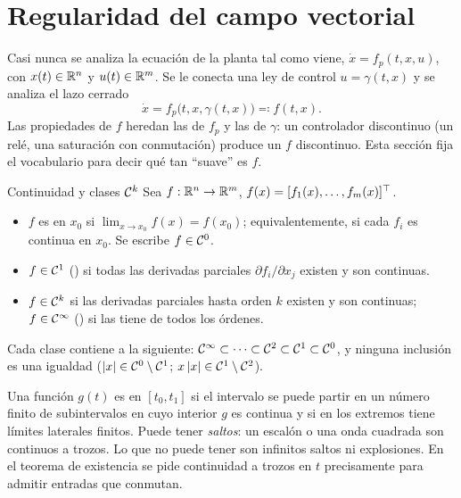 \section{Regularidad del campo vectorial}
\label{sec:pm-regularidad}

Casi nunca se analiza la ecuación de la planta tal como viene, $\dot x=f_p(t,x,u)$, con $x(t)\in\mathbb{R}^n$ y $u(t)\in\mathbb{R}^m$. Se le conecta una ley de control $u=\gamma(t,x)$ y se analiza el lazo cerrado
\begin{equation}
  \dot x=f_p\bigl(t,x,\gamma(t,x)\bigr)\eqqcolon f(t,x) .
  \label{eq:pm-lazo}
\end{equation}
Las propiedades de $f$ heredan las de $f_p$ y las de $\gamma$: un controlador discontinuo (un relé, una saturación con conmutación) produce un $f$ discontinuo. Esta sección fija el vocabulario para decir qué tan ``suave'' es $f$.

\begin{definicion}[label=def:pm-ck]{Continuidad y clases $\mathcal{C}^{k}$}
Sea $f:\mathbb{R}^n\to\mathbb{R}^m$, $f(x)=[f_1(x),\dots,f_m(x)]^{\top}$.
\begin{itemize}
  \item $f$ es  en $x_0$ si $\lim_{x\to x_0}f(x)=f(x_0)$; equivalentemente, si cada $f_i$ es continua en $x_0$. Se escribe $f\in\mathcal{C}^{0}$.
  \item $f\in\mathcal{C}^{1}$ () si todas las derivadas parciales $\partial f_i/\partial x_j$ existen y son continuas.
  \item $f\in\mathcal{C}^{k}$ si las derivadas parciales hasta orden $k$ existen y son continuas; $f\in\mathcal{C}^{\infty}$ () si las tiene de todos los órdenes.
\end{itemize}
\end{definicion}

Cada clase contiene a la siguiente: $\mathcal{C}^{\infty}\subset\cdots\subset\mathcal{C}^{2}\subset\mathcal{C}^{1}\subset\mathcal{C}^{0}$, y ninguna inclusión es una igualdad ($\left\lvert x\right\rvert\in\mathcal{C}^{0}\setminus\mathcal{C}^{1}$; $x\left\lvert x\right\rvert\in\mathcal{C}^{1}\setminus\mathcal{C}^{2}$).

\begin{cuidado}
Una función $g(t)$ es  en $[t_0,t_1]$ si el intervalo se puede partir en un número finito de subintervalos en cuyo interior $g$ es continua y si en los extremos tiene límites laterales finitos. Puede tener \emph{saltos}: un escalón o una onda cuadrada son continuos a trozos. Lo que no puede tener son infinitos saltos ni explosiones. En el teorema de existencia se pide continuidad a trozos en $t$ precisamente para admitir entradas que conmutan.
\end{cuidado}

